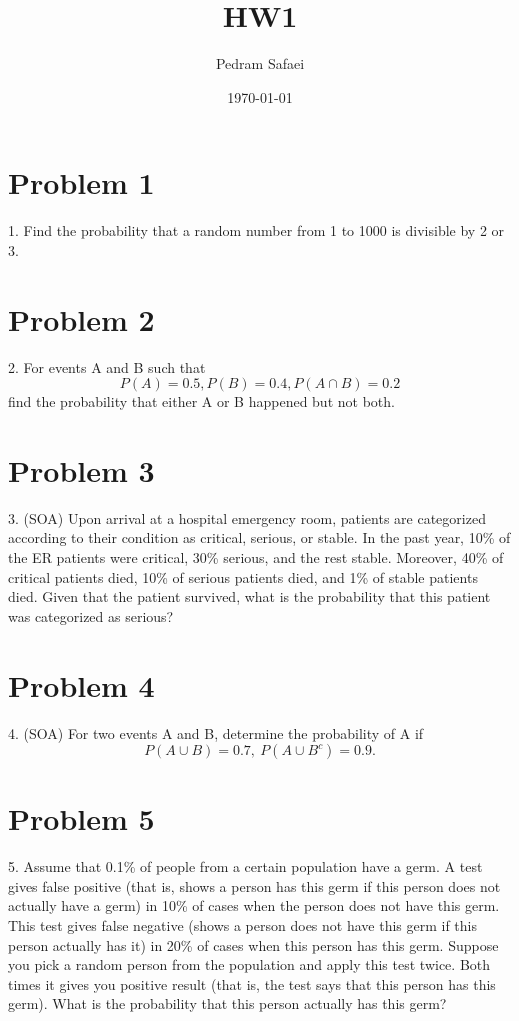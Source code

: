 \documentclass{article}
\title{HW1}
\date{\today}
\author{Pedram Safaei}
\begin{document}
	\maketitle
	\newpage
	
	\section*{Problem 1} 
	
	1. Find the probability that a random number from 1 to 1000 is divisible by 2 or 3.
	
	\section*{Problem 2} 
	2. For events A and B such that 
	\begin{equation*}
	P ( A ) = 0.5 , P ( B ) = 0.4 , P ( A \cap B ) = 0.2 
	\end{equation*}
	find the probability that either A or B happened but not both.
	
	\section*{Problem 3} 
	3. (SOA) Upon arrival at a hospital emergency room, patients are categorized according to their condition as critical, serious, or stable. In the past year, 10\% of the ER patients were critical, 30\% serious, and the rest stable. Moreover, 40\% of critical patients died, 10\% of serious patients died, and 1\% of stable patients died. Given that the patient survived, what is the probability that this patient was categorized as serious?
	
	\section*{Problem 4} 
	4. (SOA) For two events A and B, determine the probability of A if 
	\begin{equation*}
     P(A\cup B) = 0.7,\ P(A\cup B^c) = 0.9.
	\end{equation*}
	
	\section*{Problem 5} 
	5. Assume that 0.1\% of people from a certain population have a germ. A test gives false positive (that is, shows a person has this germ if this person does not actually have a germ) in 10\% of cases when the person does not have this germ. This test gives false negative (shows a person does not have this germ if this person actually has it) in 20\% of cases when this person has this germ. Suppose you pick a random person from the population and apply this test twice. Both times it gives you positive result (that is, the test says that this person has this germ). What is the probability that this person actually has this germ?
	
\end{document}
